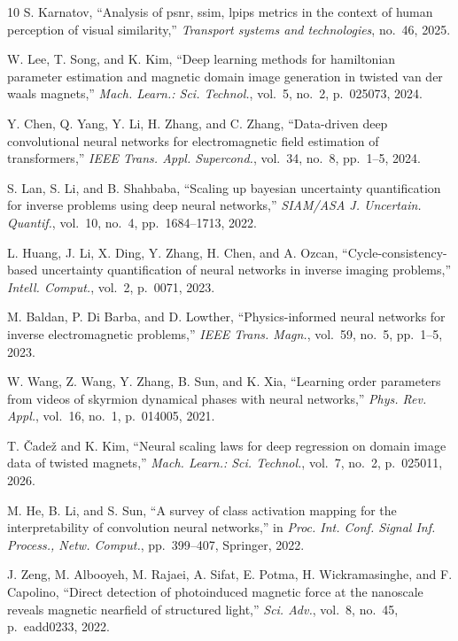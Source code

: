 \documentclass[final,5p,times,twocolumn]{elsarticle}
\begin{document}
\begin{thebibliography}{10}
S. Karnatov, ``Analysis of psnr, ssim, lpips metrics in the context of human perception of visual similarity,'' {\em Transport systems and technologies}, no.~46, 2025.

W. Lee, T. Song, and K. Kim, ``Deep learning methods for hamiltonian parameter estimation and magnetic domain image generation in twisted van der waals magnets,'' {\em Mach. Learn.: Sci. Technol.}, vol.~5, no.~2, p.~025073, 2024.

Y. Chen, Q. Yang, Y. Li, H. Zhang, and C. Zhang, ``Data-driven deep convolutional neural networks for electromagnetic field estimation of transformers,'' {\em IEEE Trans. Appl. Supercond.}, vol.~34, no.~8, pp.~1--5, 2024.

S. Lan, S. Li, and B. Shahbaba, ``Scaling up bayesian uncertainty quantification for inverse problems using deep neural networks,'' {\em SIAM/ASA J. Uncertain. Quantif.}, vol.~10, no.~4, pp.~1684--1713, 2022.

L. Huang, J. Li, X. Ding, Y. Zhang, H. Chen, and A. Ozcan, ``Cycle-consistency-based uncertainty quantification of neural networks in inverse imaging problems,'' {\em Intell. Comput.}, vol.~2, p.~0071, 2023.

M. Baldan, P. Di Barba, and D. Lowther, ``Physics-informed neural networks for inverse electromagnetic problems,'' {\em IEEE Trans. Magn.}, vol.~59, no.~5, pp.~1--5, 2023.

W. Wang, Z. Wang, Y. Zhang, B. Sun, and K. Xia, ``Learning order parameters from videos of skyrmion dynamical phases with neural networks,'' {\em Phys. Rev. Appl.}, vol.~16, no.~1, p.~014005, 2021.

T. {\v{C}}ade{\v{z}} and K. Kim, ``Neural scaling laws for deep regression on domain image data of twisted magnets,'' {\em Mach. Learn.: Sci. Technol.}, vol.~7, no.~2, p.~025011, 2026.

M. He, B. Li, and S. Sun, ``A survey of class activation mapping for the interpretability of convolution neural networks,'' in {\em Proc. Int. Conf. Signal Inf. Process., Netw. Comput.}, pp.~399--407, Springer, 2022.

J. Zeng, M. Albooyeh, M. Rajaei, A. Sifat, E. Potma, H. Wickramasinghe, and F. Capolino, ``Direct detection of photoinduced magnetic force at the nanoscale reveals magnetic nearfield of structured light,'' {\em Sci. Adv.}, vol.~8, no.~45, p.~eadd0233, 2022.


\end{thebibliography}
\end{document}
